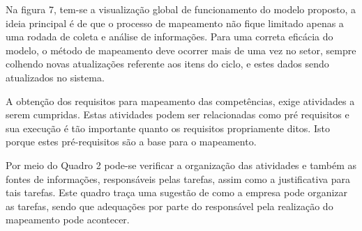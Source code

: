 Na figura 7, tem-se a visualização global de funcionamento do modelo proposto, a ideia principal é de que o processo de mapeamento não fique limitado apenas a uma rodada de coleta e análise de informações. Para uma correta eficácia do modelo, o método de mapeamento deve ocorrer mais de uma vez no setor, sempre colhendo novas atualizações referente aos itens do ciclo, e estes dados sendo atualizados no sistema.

A obtenção dos requisitos para mapeamento das competências, exige atividades a serem cumpridas. Estas atividades podem ser relacionadas como pré requisitos e sua execução é tão importante quanto os requisitos propriamente ditos. Isto porque estes pré-requisitos são a base para o mapeamento.

Por meio do Quadro 2 pode-se verificar a organização das atividades e também as fontes de informações, responsáveis pelas tarefas, assim como a justificativa para tais tarefas. Este quadro traça uma sugestão de como a empresa pode organizar as tarefas, sendo que adequações por parte do responsável pela realização do mapeamento pode acontecer.

